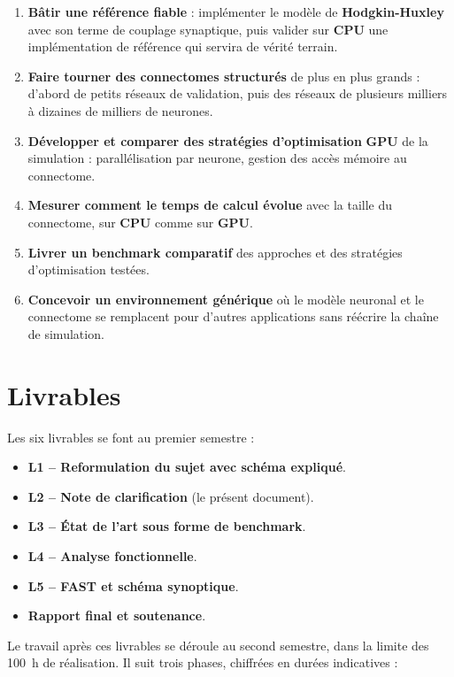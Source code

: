 \begin{enumerate}
    \item \textbf{Bâtir une référence fiable} : implémenter le modèle de \textbf{Hodgkin-Huxley} avec son terme de couplage synaptique, puis valider sur \textbf{CPU} une implémentation de référence qui servira de vérité terrain.
    \item \textbf{Faire tourner des connectomes structurés} de plus en plus grands : d'abord de petits réseaux de validation, puis des réseaux de plusieurs milliers à dizaines de milliers de neurones.
    \item \textbf{Développer et comparer des stratégies d'optimisation} \textbf{GPU} de la simulation : parallélisation par neurone, gestion des accès mémoire au connectome.
    \item \textbf{Mesurer comment le temps de calcul évolue} avec la taille du connectome, sur \textbf{CPU} comme sur \textbf{GPU}.
    \item \textbf{Livrer un benchmark comparatif} des approches et des stratégies d'optimisation testées.
    \item \textbf{Concevoir un environnement générique} où le modèle neuronal et le connectome se remplacent pour d'autres applications sans réécrire la chaîne de simulation.
\end{enumerate}

\section{Livrables}
\label{sec:l2-livrables}

Les six livrables se font au premier semestre :

\begin{itemize}
    \item \textbf{L1 -- Reformulation du sujet avec schéma expliqué}.
    \item \textbf{L2 -- Note de clarification} (le présent document).
    \item \textbf{L3 -- État de l'art sous forme de benchmark}.
    \item \textbf{L4 -- Analyse fonctionnelle}.
    \item \textbf{L5 -- FAST et schéma synoptique}.
    \item \textbf{Rapport final et soutenance}.
\end{itemize}

Le travail après ces livrables se déroule au second semestre, dans la limite des 100~h de réalisation. Il suit trois phases, chiffrées en durées indicatives :


